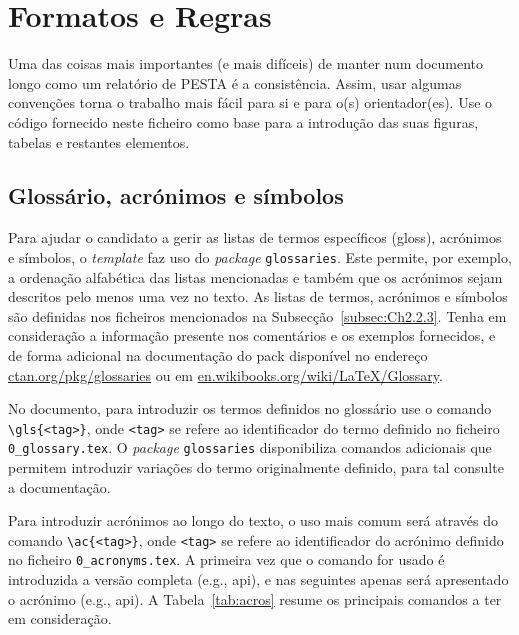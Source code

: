 
\section{Formatos e Regras}

Uma das coisas mais importantes (e mais difíceis) de manter num documento longo como um relatório de PESTA é a consistência. Assim, usar algumas convenções torna o trabalho mais fácil para si e para o(s) orientador(es). Use o código fornecido neste ficheiro como base para a introdução das suas figuras, tabelas e restantes elementos. 


\subsection{Glossário, acrónimos e símbolos}

Para ajudar o candidato a gerir as listas de termos específicos (\gls{gloss}), acrónimos e símbolos, o \textit{template} faz uso do \textit{package} \verb|glossaries|. Este permite, por exemplo, a ordenação alfabética das listas mencionadas e também que os acrónimos sejam descritos pelo menos uma vez no texto. As listas de termos, acrónimos e símbolos são definidas nos ficheiros mencionados na Subsecção~\ref{subsec:Ch2.2.3}. Tenha em consideração a informação presente nos comentários e os exemplos fornecidos, e de forma adicional na documentação do \gls{pack} disponível no endereço \url{ctan.org/pkg/glossaries} ou em \url{en.wikibooks.org/wiki/LaTeX/Glossary}.

No documento, para introduzir os termos definidos no glossário use o comando \verb|\gls{<tag>}|, onde \verb|<tag>| se refere ao identificador do termo definido no ficheiro \verb|0_glossary.tex|. O \textit{package} \verb|glossaries| disponibiliza comandos adicionais que permitem introduzir variações do termo originalmente definido, para tal consulte a documentação.

Para introduzir acrónimos ao longo do texto, o uso mais comum será através do comando \verb|\ac{<tag>}|, onde \verb|<tag>| se refere ao identificador do acrónimo definido no ficheiro \verb|0_acronyms.tex|. A primeira vez que o comando for usado é introduzida a versão completa (e.g., \ac{api}), e nas seguintes apenas será apresentado o acrónimo (e.g., \ac{api}). A Tabela~\ref{tab:acros} resume os principais comandos a ter em consideração. 


